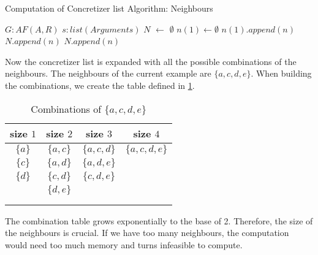 \begin{algorithm}
    \caption{Computation of Concretizer list Algorithm: Neighbours}\label{alg:concretizerListNeighbours}
    \begin{algorithmic}[1]
        \Require $G: AF(A, R)$ 
        \Require $s: list(Arguments)$ 
        \State $N$ $\gets$ $\emptyset$ 
        \State $n(1) \gets \emptyset$ 
         
             
                \State $n(1).append(n)$
                \State $N.append(n)$
            \EndFor
                 
                    \State $N.append(n)$
                \EndFor
            \EndFor
        \EndFor
    \end{algorithmic}
\end{algorithm}


Now the concretizer list is expanded with all the possible combinations of the neighbours. The neighbours of the current example are $\{a, c, d, e\}$. When building the combinations, we create the table defined in \cref{table:algorithmConcretizer1}.

\begin{table}[htb]
    \centering
    \caption{Combinations of $\{a, c, d, e\}$}
    \begin{tabular}{ |c|c|c|c| }
     \hline
     size $1$ & size $2$ & size $3$ & size $4$\\
     \hline
     \hline
     $\{a\}$ & $\{a, c\}$ & $\{a, c, d\}$ &$\{a, c, d, e\}$ \\
     \hline
     $\{c\}$ & $\{a, d\}$ & $\{a, d, e\}$ & \\
     \hline
     $\{d\}$ & $\{c, d\}$ & $\{c, d, e\}$ & \\
     \hline
      & $\{d, e\}$ &  & \\
     \hline
       &  &  & \\
     \hline
       &  &  & \\
     \hline
    \end{tabular}
\label{table:algorithmConcretizer1}
\end{table}

The combination table grows exponentially to the base of 2. Therefore, the size of the neighbours is crucial. If we have too many neighbours, the computation would need too much memory and turns infeasible to compute.

